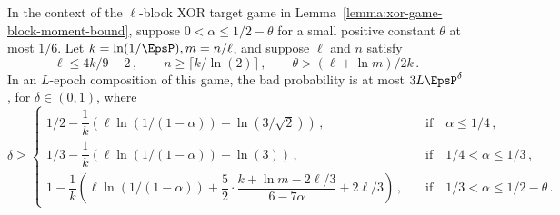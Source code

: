 \begin{theorem}\label{thm:xor-game-block-composition-prob}
In the context of the $\ell$-block XOR target game in Lemma~\ref{lemma:xor-game-block-moment-bound}, 
suppose $0 < \alpha \leq 1/2 - \theta$ for a small positive constant $\theta$ at most $1/6$.
Let $k = \ln(1/\EpsP), m = n/\ell$, and 
suppose $\ell$ and $n$ satisfy 
\[
    \ell \leq 4k/9 - 2\,, \qquad 
    n \geq \lceil k/\ln(2) \rceil \,, \qquad
    \theta > (\ell + \ln m)/2k
    \,.
\] 
In an $L$-epoch composition of this game, 
the bad probability is at most $3 L \EpsP^{\delta}$, for $\delta \in (0, 1)$, 
where
\[
    \delta \geq \begin{cases}
        1/2 - \dfrac{1}{k}\left( \ell  \ln(1/(1- \alpha)) - \ln(3/\sqrt{2}) \right)
            \,, & \quad \text{if}\quad \alpha \leq 1/4\,, \\[1em]
        1/3 - \dfrac{1}{k}\left(\ell \ln(1/(1- \alpha)) - \ln(3) \right)
            \,, & \quad \text{if}\quad 1/4 < \alpha \leq 1/3\,, \\[1em]
        1 - \dfrac{1}{k}\left( \ell \ln(1/(1-\alpha)) + 
            \dfrac{5}{2}\cdot \dfrac{k + \ln m - 2\ell/3}{6-7\alpha} 
            + 2\ell/3 \right)
            \,, & \quad\text{if}\quad 
            1/3 < \alpha \leq 1/2 - \theta
            \,.
    \end{cases}
\]
\end{theorem}
